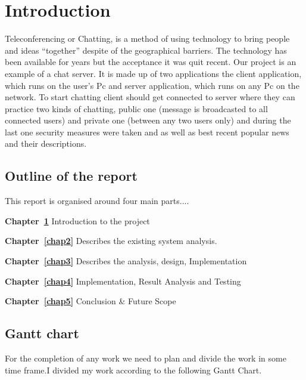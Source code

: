 \chapter{Introduction}\label{chap1}

Teleconferencing or Chatting, is a method of using technology to bring people and ideas “together” despite of the geographical barriers.  The technology has been available for years but the acceptance it was quit recent.  Our project is an example of a chat server.  It is made up of two applications the client application, which runs on the user’s Pc and server application, which runs on any Pc on the network.  To start chatting client should get connected to server where they can practice two kinds of chatting, public one (message is broadcasted to all connected users) and private one (between any two users only) and during the last one security measures were taken and as well as best recent popular news and their descriptions.

\vspace*{20 ex}


\section{Outline of the report}
This report is organised around four main parts....
\begin{onehalfspace}

{\bf Chapter~\ref{chap1}}  Introduction to the project
  
{\bf Chapter~\ref{chap2}}  Describes the existing system analysis.

{\bf Chapter~\ref{chap3}}  Describes the analysis, design, Implementation
 
{\bf Chapter~\ref{chap4}}  Implementation, Result Analysis and Testing

{\bf Chapter~\ref{chap5}}  Conclusion \& Future Scope

\end{onehalfspace}

\section{Gantt chart}
For the completion of any work we need to plan and divide the work in some time frame.I
divided my work according to the following Gantt Chart.


